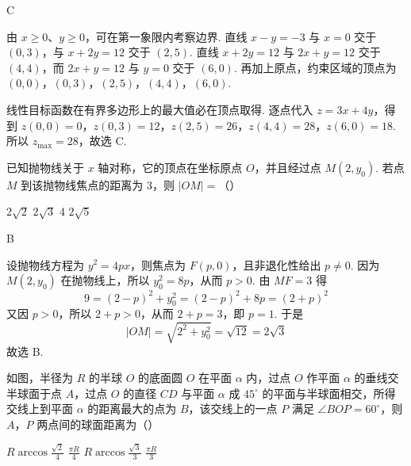 \begin{answer}
C
\end{answer}

\begin{solution}
由 \(x\geq0\)、\(y\geq0\)，可在第一象限内考察边界. 直线 \(x-y=-3\) 与 \(x=0\) 交于 \((0,3)\)，与 \(x+2y=12\) 交于 \((2,5)\). 直线 \(x+2y=12\) 与 \(2x+y=12\) 交于 \((4,4)\)，而 \(2x+y=12\) 与 \(y=0\) 交于 \((6,0)\). 再加上原点，约束区域的顶点为
\((0,0)\)，\((0,3)\)，\((2,5)\)，\((4,4)\)，\((6,0)\).

线性目标函数在有界多边形上的最大值必在顶点取得. 逐点代入 \(z=3x+4y\)，得到
\(z(0,0)=0\)，\(z(0,3)=12\)，\(z(2,5)=26\)，\(z(4,4)=28\)，\(z(6,0)=18\).
所以 \(z_{\max}=28\)，故选 C.
\end{solution}

\begin{problem}
已知抛物线关于 \(x\) 轴对称，它的顶点在坐标原点 \(O\)，并且经过点 \(M(2, y_0)\). 若点 \(M\) 到该抛物线焦点的距离为 3，则 \(|OM| =\)（\quad）

\choices
    {\(2\sqrt{2}\)}
    {\(2\sqrt{3}\)}
    {4}
    {\(2\sqrt{5}\)}
\end{problem}

\begin{answer}
B
\end{answer}

\begin{solution}
设抛物线方程为 \(y^2=4px\)，则焦点为 \(F(p,0)\)，且非退化性给出 \(p\ne0\). 因为 \(M(2,y_0)\) 在抛物线上，所以 \(y_0^2=8p\)，从而 \(p>0\). 由 \(MF=3\) 得
\[
9=(2-p)^2+y_0^2=(2-p)^2+8p=(2+p)^2
\]
又因 \(p>0\)，所以 \(2+p>0\)，从而 \(2+p=3\)，即 \(p=1\). 于是
\[
|OM|=\sqrt{2^2+y_0^2}=\sqrt{12}=2\sqrt3
\]
故选 B.
\end{solution}

\begin{problem}
如图，半径为 \(R\) 的半球 \(O\) 的底面圆 \(O\) 在平面 \(\alpha\) 内，过点 \(O\) 作平面 \(\alpha\) 的垂线交半球面于点 \(A\)，过点 \(O\) 的直径 \(CD\) 与平面 \(\alpha\) 成 \(45^{\circ}\) 的平面与半球面相交，所得交线上到平面 \(\alpha\) 的距离最大的点为 \(B\)，该交线上的一点 \(P\) 满足 \(\angle BOP=60^{\circ}\)，则 \(A\)，\(P\) 两点间的球面距离为（\quad）


\choices
    {\(R\arccos\frac{\sqrt{2}}{4}\)}
    {\(\frac{\pi R}{4}\)}
    {\(R\arccos\frac{\sqrt{3}}{3}\)}
    {\(\frac{\pi R}{3}\)}
\end{problem}

